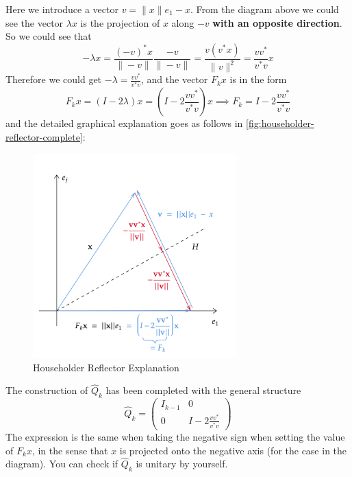\noindent Here we introduce a vector $v = \|x\|e_1 - x$. From the diagram above we could see the vector $\lambda x$ is the projection of  $x$ along $-v$ \textbf{with an opposite direction}. So we could see that
 \[
-\lambda x = \frac{(-v)^{*}x}{\|-v\|} \frac{-v}{\|-v\|} = \frac{v(v^{*}x)}{\|v\|^2} = \frac{vv^{*}}{v^{*}v}x
\]
Therefore we could get $-\lambda = \frac{vv^{*}}{v^{*}v}$, and the vector $F_kx$ is in the form
\[
F_kx = (I - 2\lambda)x = (I - 2\frac{vv^{*}}{v^{*}v}) x \implies F_k = I - 2\frac{vv^{*}}{v^{*}v}
\] 
and the detailed graphical explanation goes as follows in \autoref{fig:householder-reflector-complete}:
\begin{figure}[H]
  \centering
  \includegraphics[width=0.7\textwidth]{./imgs/householder-reflector-complete.png}
  \caption{Householder Reflector Explanation}
  \label{fig:householder-reflector-complete}
\end{figure}
\noindent The construction of $\hat{Q}_k$ has been completed with the general structure
\[
  \hat{Q}_k = \begin{pmatrix} I_{k - 1} & 0 \\ 0 & I - 2\frac{vv^{*}}{v^{*}v} \end{pmatrix} 
\]
The expression is the same when taking the negative sign when setting the value of $F_kx$, in the sense that \(x\)  is projected onto the negative axis (for the case in the diagram). You can check if \(\hat{Q}_{k}\) is unitary by yourself. \medskip

